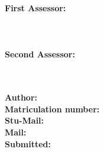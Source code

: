 \begin{titlepage}
\begin{center}
        \pagebreak
        \begin{center}
            \textbf{First Assessor:} \\[0.2in]
            {\large \firstsupervisorname} \\[0.2in]
            {\large \firstsupervisortitle} \\[0.2in]
            {\large \firstsupervisordepartment} \\[0.5in]
            \textbf{Second Assessor:} \\[0.2in]
            {\large \secondsupervisorname} \\[0.2in]
            {\large \secondsupervisortitle} \\[0.2in]
            {\large \secondsupervisordepartment}
        \end{center}
        \vfill
        \begin{flushleft}
            \textbf{Author: \thesisauthor} \\[0.1in]
            \textbf{Matriculation number: \stunumber} \\[0.1in]
            \textbf{Stu-Mail: \stuemail} \\[0.1in]
            \textbf{Mail: \privatemail} \\[0.1in]
            \textbf{Submitted: \submissiondate} \\[0.1in]
        \end{flushleft}
    \end{center}
\end{titlepage}